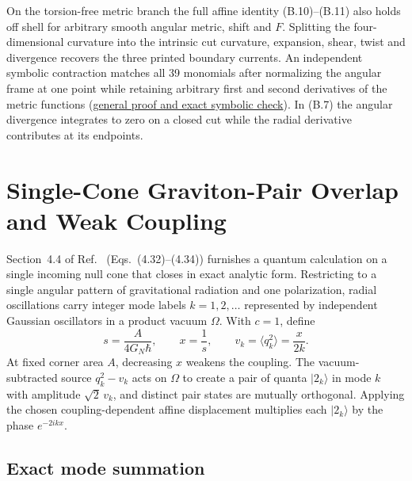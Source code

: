 \documentclass[10pt,a4paper]{article}
\numberwithin{equation}{section}
\newcommand{\repo}[2]{\href{https://github.com/sprajs/quantum-gravity/blob/main/#1}{#2}}
\begin{document}
On the torsion-free metric branch the full affine identity (B.10)--(B.11) also holds off shell for arbitrary smooth angular metric, shift and $F$. Splitting the four-dimensional curvature into the intrinsic cut curvature, expansion, shear, twist and divergence recovers the three printed boundary currents. An independent symbolic contraction matches all 39 monomials after normalizing the angular frame at one point while retaining arbitrary first and second derivatives of the metric functions (\repo{audit/bulk-identity.md}{general proof and exact symbolic check}). In (B.7) the angular divergence integrates to zero on a closed cut while the radial derivative contributes at its endpoints.

\section{Single-Cone Graviton-Pair Overlap and Weak Coupling}
\label{sec:pair}

Section~4.4 of Ref.~\cite{Chandrasekaran2026} (Eqs.~(4.32)--(4.34)) furnishes a quantum calculation on a single incoming null cone that closes in exact analytic form.
Restricting to a single angular pattern of gravitational radiation and one polarization, radial oscillations carry integer mode labels $k=1,2,\dots$ represented by independent Gaussian oscillators in a product vacuum $\Omega$.
With $c=1$, define
\begin{equation}
  s = \frac{A}{4G_N\hbar}, \qquad x = \frac{1}{s}, \qquad v_k = \langle q_k^2\rangle = \frac{x}{2k}.
  \label{eq:pair-params}
\end{equation}
At fixed corner area $A$, decreasing $x$ weakens the coupling.
The vacuum-subtracted source $q_k^2 - v_k$ acts on $\Omega$ to create a pair of quanta $|2_k\rangle$ in mode $k$ with amplitude $\sqrt{2}\,v_k$, and distinct pair states are mutually orthogonal.
Applying the chosen coupling-dependent affine displacement multiplies each $|2_k\rangle$ by the phase $e^{-2ikx}$.

\subsection{Exact mode summation}
\end{document}
